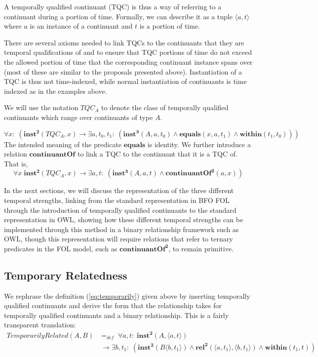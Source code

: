 \documentclass{ao2e}
\newcommand{\mirel}[1]{\ensuremath{\mathrm{\mathbf{#1}}}}
\newcommand{\mclass}[1]{\ensuremath{\mathit{#1}}}
\newcommand{\mrel}[2]{\mirel{#1^#2}}
\newcommand{\mrelb}[1]{\mrel{#1}{2}}
\newcommand{\mrelt}[1]{\mrel{#1}{3}}
\newcommand{\pair}[2]{\ensuremath{\langle #1,#2\rangle}}
\newcommand{\TQC}[1]{\ensuremath{TQC_{\mclass{#1}}}}
\begin{document}
A temporally qualified continuant (TQC) is thus a way of referring to a continuant
during a portion of time. Formally, we can describe it as a tuple \pair{a}{t}
where $a$ is an instance
of a continuant and $t$ is a portion of time. 

There are several axioms needed to link TQCs to the continuants that they are
temporal qualifications of and to ensure that TQC portions of time do not exceed the
allowed portion of time that the corresponding continuant instance spans over
(most of these are similar to the proposals presented above).
Instantiation of a TQC is thus not time-indexed, while normal instantiation of
continuants is time indexed as in the examples above. 


We will use the notation \TQC{A} to denote the class of temporally qualified
continuants which range over continuants of type \mclass{A}.

\begin{equation}
\forall x:\; (\mrelb{inst}(\TQC{A},x) \rightarrow \exists a,t_0,t_1:\;(
\mrelt{inst}(\mclass{A},a,t_0) \wedge \mirel{equals}(x,a,t_1) \wedge
\mirel{within}(t_1,t_0)))
\end{equation}
The intended meaning of the predicate \mirel{equals} is identity.  
We further introduce a relation \mirel{continuantOf} to link a TQC to the continuant
that it is a TQC of. That is, 
\begin{equation}
\forall x\; \mrelb{inst}(\TQC{A},x) \rightarrow \exists a,t:\;(
\mrelt{inst}(\mclass{A}, a,t) \wedge \mrelb{continuantOf}(a,x))
\end{equation}

In the next sections, we will discuss the representation of the three different
temporal strengths, linking from the standard representation in BFO FOL through
the introduction of temporally qualified continuants to the standard
representation in OWL, showing how these different temporal strengths can be
implemented through this method in a binary relationship framework such as OWL,
though this representation will require relations that refer to ternary
predicates in the FOL model, such as \mrelb{continuantOf}, to remain primitive.
\subsection{Temporary Relatedness}

We rephrase the definition (\ref{eq:temporarily}) given above by inserting
temporally qualified continuants and derive the form that the relationship takes
for temporally qualified continuants and a binary relationship. This is a fairly
transparent translation:
\begin{equation}
\begin{split}
\mclass{TemporarilyRelated}(\mclass{A},\mclass{B})& =_{def}\;
\forall a, t:\; \mrelb{inst}(\mclass{A}, \pair{a}{t}) \\
&\ \rightarrow
\exists b, t_1:\;(\mrelb{inst}(\mclass{B}\pair{b}{t_1}) \wedge
\mrelb{rel}(\pair{a}{t_1},\pair{b}{t_1}) \wedge \mirel{within}(t_1,t))
\end{split}
\end{equation}
\end{document}
